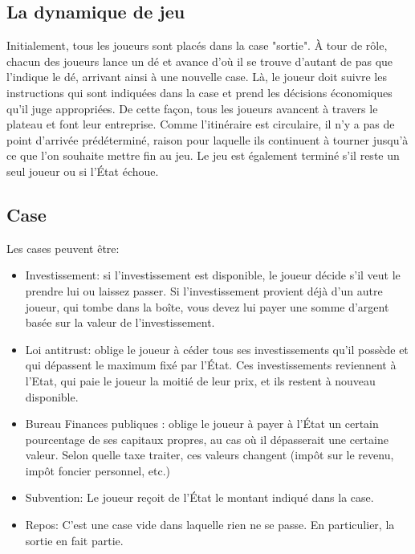\documentclass[12pt]{article}
\begin{document}
    \subsection{La dynamique de jeu}
    Initialement, tous les joueurs sont placés dans la case "sortie". À tour de rôle, chacun
    des joueurs lance un dé et avance d'où il se trouve d'autant de pas que l'indique le
    dé, arrivant ainsi à une nouvelle case. Là, le joueur doit suivre les instructions
    qui sont indiquées dans la case et prend les décisions économiques qu'il juge appropriées.
    De cette façon, tous les joueurs avancent à travers le plateau et font leur
    entreprise. Comme l'itinéraire est circulaire, il n'y a pas de point d'arrivée prédéterminé,
    raison pour laquelle ils continuent à tourner jusqu'à ce que l'on souhaite mettre fin au jeu.
    Le jeu est également terminé s'il reste un seul joueur ou si l'État échoue.
    
    \subsection{Case}
    Les cases peuvent être:
    \begin{itemize}
        \item Investissement: si l'investissement est disponible, le joueur décide s'il veut le prendre
    lui ou laissez passer. Si l'investissement provient déjà d'un autre joueur, qui tombe dans la boîte, vous devez lui payer une somme d'argent basée sur la valeur de l'investissement.
    
        \item Loi antitrust: oblige le joueur à céder tous ses investissements
    qu'il possède et qui dépassent le maximum fixé par l'État. Ces investissements reviennent à l'Etat, qui paie le joueur la moitié de leur prix, et ils restent
    à nouveau disponible.
        \item  Bureau Finances publiques : oblige le joueur à payer à l'État un certain pourcentage de ses
    capitaux propres, au cas où il dépasserait une certaine valeur. Selon quelle taxe
    traiter, ces valeurs changent (impôt sur le revenu, impôt foncier personnel, etc.)
        \item Subvention: Le joueur reçoit de l'État le montant indiqué dans la case.
        \item Repos: C'est une case vide dans laquelle rien ne se passe. En particulier, la sortie
    en fait partie.
    \end{itemize}
\end{document}
